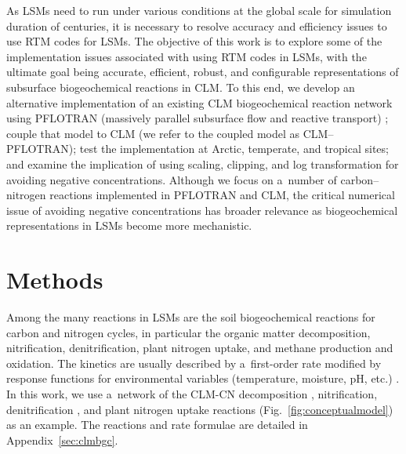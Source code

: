 \documentclass[gmd,noline]{copernicus}
\begin{document}
      As LSMs need to run under various conditions at the global scale for
      simulation duration of centuries, it is necessary to resolve accuracy
      and efficiency issues to use RTM codes for LSMs. The objective of this
      work is to explore some of the implementation issues associated with
      using RTM codes in LSMs, with the ultimate goal being accurate,
      efficient, robust, and configurable representations of subsurface
      biogeochemical reactions in CLM. To this end, we develop an
      alternative implementation of an existing CLM biogeochemical reaction
      network using PFLOTRAN (massively parallel subsurface flow and reactive transport) \citep{Lichtner2015,Hammond2014}; couple that
      model to CLM (we refer to the coupled model as CLM--PFLOTRAN); test the
      implementation at Arctic, temperate, and tropical sites; and examine
      the implication of using scaling, clipping, and log transformation for
      avoiding negative concentrations.  Although we focus on a~number of
      carbon--nitrogen reactions implemented in PFLOTRAN and CLM, the
      critical numerical issue of avoiding negative concentrations has
      broader relevance as biogeochemical representations in LSMs become
      more mechanistic.



\section{Methods}%

      Among the many reactions in LSMs are the soil biogeochemical reactions
      for carbon and nitrogen cycles, in particular the organic matter
      decomposition, nitrification, denitrification,    plant nitrogen uptake,
      and methane production and oxidation.  The kinetics are usually
      described by a~first-order rate modified by response functions for
      environmental variables (temperature, moisture, pH, etc.)
      \citep{Bonan2012,Boyer2006,Schmidt2011}.  In this work, we use
      a~network of the CLM-CN decomposition
      \citep{Bonan2012,Oleson2013,Thornton2005}, nitrification,
      denitrification \citep{Dickinson2002,Parton2001,Parton1996}, and plant
      nitrogen uptake reactions (Fig.~\ref{fig:conceptualmodel}) as an
      example. The reactions and rate formulae are detailed in
      Appendix~\ref{sec:clmbgc}.
\end{document}
